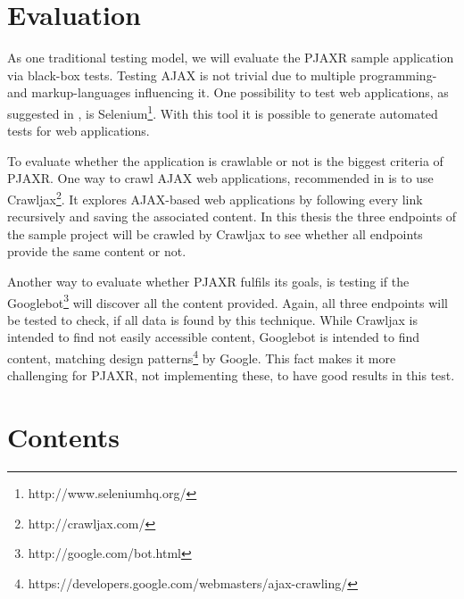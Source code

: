 \documentclass[f,bachelor,binding,twoside,palatino]{WeSTthesis}
\begin{document}
\section{Evaluation}
  As one traditional testing model, we will evaluate the PJAXR sample application via black-box tests.
  Testing AJAX is not trivial due to multiple programming- and markup-languages influencing it. 
  One possibility to test web applications, as suggested in \cite{lundmark11}, is Selenium\footnote{http://www.seleniumhq.org/}.
  With this tool it is possible to generate automated tests for web applications.
  
  To evaluate whether the application is crawlable or not is the biggest criteria of PJAXR.
  One way to crawl AJAX web applications, recommended in \cite{crawljax:tweb12} is to use Crawljax\footnote{http://crawljax.com/}. 
  It explores AJAX-based web applications by following every link recursively and saving the associated content. In this thesis the three endpoints of the sample project will be crawled by Crawljax to see whether all endpoints provide the same content or not.
  
  Another way to evaluate whether PJAXR fulfils its goals, is testing if the Googlebot\footnote{http://google.com/bot.html} will discover all the content provided.
  Again, all three endpoints will be tested to check, if all data is found by this technique.
  While Crawljax is intended to find not easily accessible content, Googlebot is intended to find content, matching design patterns\footnote{https://developers.google.com/webmasters/ajax-crawling/} by Google. This fact makes it more challenging for PJAXR, not implementing these, to have good results in this test.

\section{Contents}
\end{document}
